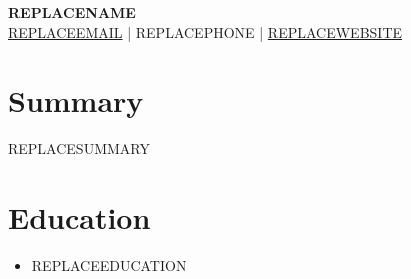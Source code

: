 \documentclass{article}
\begin{document}
\begin{center}
    {\Huge \bfseries REPLACENAME}
    \vspace{2mm} \\
    \href{mailto:REPLACEEMAIL}{REPLACEEMAIL} | REPLACEPHONE | \href{http://REPLACEWEBSITE}{REPLACEWEBSITE}

\end{center}

\section*{Summary}
REPLACESUMMARY

\section*{Education}
\begin{itemize}[leftmargin=*]
    \item REPLACEEDUCATION
\end{itemize}
\end{document}
